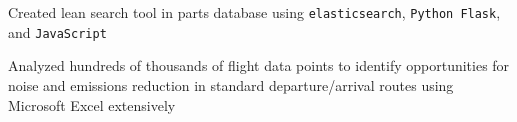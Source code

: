 \documentclass[]{deedy-resume-openfont}
\begin{document}




\sectionsep




\begin{tightemize}
\item Created lean search tool in parts database using \verb|elasticsearch|, \verb|Python Flask|, and \verb|JavaScript|
\end{tightemize}
\sectionsep

\newpage

\begin{tightemize}
\item Analyzed hundreds of thousands of flight data points to identify opportunities for noise and emissions reduction in standard departure/arrival routes using Microsoft Excel extensively
\end{tightemize}
\end{document}
